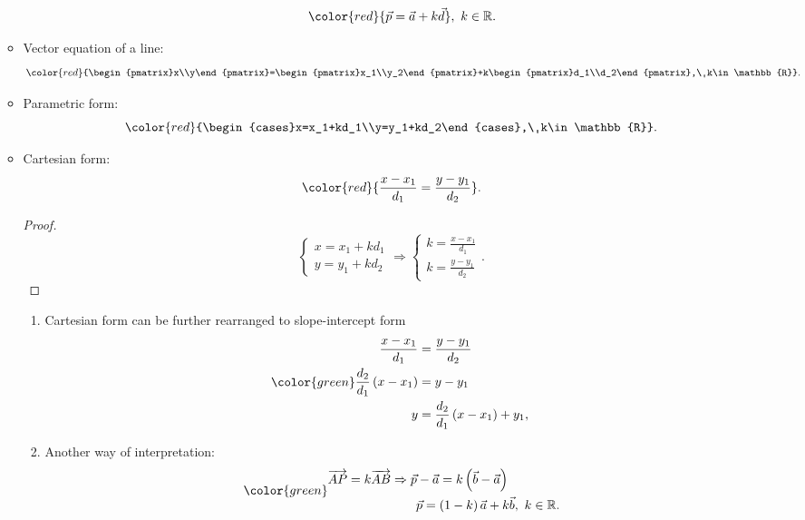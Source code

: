 \documentclass[12pt, a4paper]{article}
\newtheorem{proof}{Proof}[subsection]
\def\d{{\mathrm{d}}}
\begin{document}
\begin{enumerate}
\begin{itemize}
\begin{enumerate}
      $${\color{red}{\vec{p}=\vec{a}+k\vec{d}}},\ k\in\mathbb{R}.$$
    \end{enumerate}
    \item Vector equation of a line: 
    $${\color{red}{\begin{pmatrix}x\\y\end{pmatrix}=\begin{pmatrix}x_1\\y_2\end{pmatrix}+k\begin{pmatrix}d_1\\d_2\end{pmatrix},\ k\in\mathbb{R}}}.$$
    \item Parametric form: 
    $${\color{red}{\begin{cases}x=x_1+kd_1\\y=y_1+kd_2\end{cases},\ k\in\mathbb{R}}}.$$
    \item Cartesian form: 
    $${\color{red}{\frac{x-x_1}{d_1}=\frac{y-y_1}{d_2}}}.$$
    \begin{proof}
      $$\begin{cases}x=x_1+kd_1\\y=y_1+kd_2\end{cases}\Rightarrow\begin{cases}k=\frac{x-x_1}{d_1}\\k=\frac{y-y_1}{d_2}\end{cases}.$$
    \end{proof}
    \begin{enumerate}
      \item Cartesian form can be further rearranged to slope-intercept form
      $$\color{green}
      \begin{aligned}
        \frac{x-x_1}{d_1}&=\frac{y-y_1}{d_2}\\
        \frac{d_2}{d_1}\left(x-x_1\right)&=y-y_1\\
        y&=\frac{d_2}{d_1}\left(x-x_1\right)+y_1,\ 
      \end{aligned}$$
      {}
      \item Another way of interpretation: 
      $$\color{green}
      \begin{aligned}
        \overrightarrow{AP}=k\overrightarrow{AB}&\Rightarrow\vec{p}-\vec{a}=k\left(\vec{b}-\vec{a}\right)\\
        &\ \ \ \ \ \ \vec{p}=\left(1-k\right)\vec{a}+k\vec{b},\ k\in\mathbb{R}.\\

\end{aligned}$$
\end{enumerate}
\end{itemize}
\end{enumerate}
\end{document}
